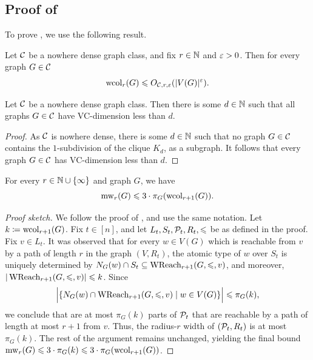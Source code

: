 \subsection{Proof of }


To prove , we use the following result.
\begin{fact}\label{fact:nd-wcol}
    Let $\CC$ be a nowhere dense graph class, and fix $r\in\N$ and $\eps>0$.
    Then for every graph $G\in\CC$
    $$\wcol_r(G)\le O_{\CC,r,\eps}(|V(G)|^{\eps}).$$
\end{fact}

\begin{lemma}\label{lem:nd-VC}
    Let $\CC$ be a nowhere dense graph class. 
    Then there is some $d\in \N$ such that all graphs $G\in \CC$ have VC-dimension less than $d$.
\end{lemma}
\begin{proof}
    As $\CC$ is nowhere dense, there is some $d\in\N$ such that 
    no graph $G\in \CC$ contains the $1$-subdivision of the clique $K_d$, as a subgraph.
    It follows that every graph $G\in \CC$ has VC-dimension less than $d$.
\end{proof}


\begin{lemma}\label{lem:wcol-poly}
    For every $r\in\N\cup\set{\infty}$ and graph $G$, we have
    $$\mw_r(G)\le 3\cdot\pi_G(\wcol_{r+1}(G)).$$
  \end{lemma}
  \begin{proof}[Proof sketch]
    We follow the proof of , and use the same notation. 
    Let \(k\coloneqq\wcol_{r+1}(G)\).
    Fix $t\in [n]$, and let $L_t,S_t,\cal P_t,R_t,\le$ be as defined in the proof.
    Fix $v\in L_t$.
    It was observed that for every $w\in V(G)$ which is reachable from $v$ by a path of length $r$
in the graph $(V,R_t)$, 
 the atomic type of $w$ over $S_t$ is uniquely 
determined by $N_G(w)\cap S_t \subseteq \wreach_{r+1}(G,\le,v)$,
and moreover, $|\wreach_{r+1}(G,\le,v)|\le k$.
Since $$\Big|\setof{N_G(w)\cap \wreach_{r+1}(G,\le,v)}{w\in V(G)}\Big|\le  \pi_G(k),$$
we conclude that are at most $\pi_G(k)$ parts of $\cal P_t$ 
that are reachable by a path of length at most $r+1$ from $v$.
Thus, the radius-$r$ width of $(\cal P_t,R_t)$ is at most
$\pi_G(k)$. The rest of the argument remains unchanged, yielding the final bound $\mw_r(G)\le 3\cdot \pi_G(k)\le 3\cdot \pi_G(\wcol_{r+1}(G))$.
  \end{proof}
  
